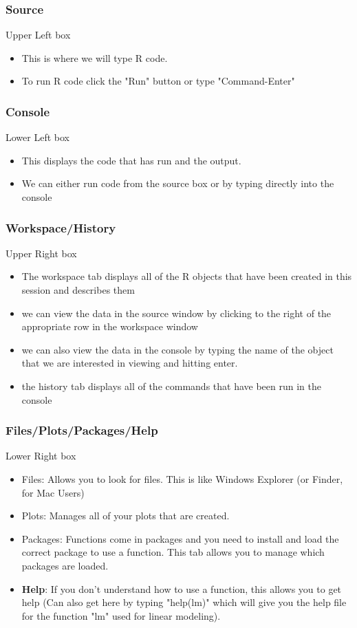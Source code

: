 
\begin{frame}
\frametitle{Source}
Upper Left box
\begin{itemize}
\item This is where we will type R code.  
\item To run R code click the "Run" button or type "Command-Enter"
\end{itemize}
\end{frame}
\begin{frame}
\frametitle{Console}
Lower Left box
\begin{itemize}
\item This displays the code that has run and the output.  
\item We can either run code from the source box or by typing directly into the console
\end{itemize}
\end{frame}
\begin{frame}
\frametitle{Workspace/History}
Upper Right box
\begin{itemize}
\item The workspace tab displays all of the R objects that have been created in this session and describes them 
\item we can view the data in the source window by clicking to the right of the appropriate row in the workspace window
\item we can also view the data in the console by typing the name of the object that we are interested in viewing and hitting enter.  
\item the history tab displays all of the commands that have been run in the console
\end{itemize}
\end{frame}


\begin{frame}
\frametitle{Files/Plots/Packages/Help}
Lower Right box
\begin{itemize}
\item Files: Allows you to look for files.  This is like Windows Explorer (or Finder, for Mac Users)
\item Plots: Manages all of your plots that are created.
\item Packages: Functions come in packages and you need to install and load the correct package to use a function.  This tab allows you to manage which packages are loaded.  
\item {\bf Help}:  If you don't understand how to use a function, this allows you to get help (Can also get here by typing "help(lm)" which will give you the help file for the function "lm" used for linear modeling).
\end{itemize}
\end{frame}


